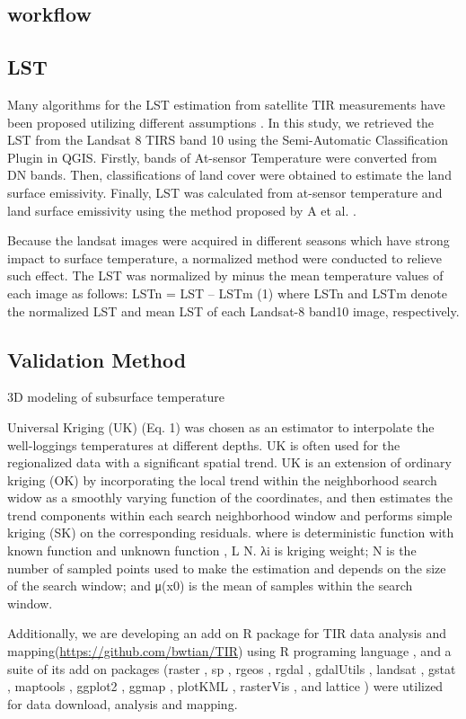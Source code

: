 \subsection{workflow}
\subsection{LST}  

Many algorithms for the LST estimation from satellite TIR measurements have been proposed utilizing different assumptions \cite{Li2013a, Li2012}. In this study, we retrieved the LST from the Landsat 8 TIRS band 10 using the Semi-Automatic Classification Plugin in QGIS. Firstly, bands of At-sensor Temperature were converted from DN bands. Then, classifications of land cover were obtained to estimate the land surface emissivity. Finally, LST was calculated from at-sensor temperature and land surface emissivity using the method proposed by A et al. \cite{Artis1982}.

Because the landsat images were acquired in different seasons which have strong impact to surface temperature, a normalized method were conducted to relieve such effect. The LST was normalized by minus the mean temperature values of each image as follows: 
LSTn = LST – LSTm                             (1)
where LSTn and LSTm denote the normalized LST and mean LST of each Landsat-8 band10 image, respectively.  

\subsection{Validation Method}
3D modeling of subsurface temperature

Universal Kriging (UK) (Eq. 1) was chosen as an estimator to interpolate the well-loggings temperatures at different depths. UK is often used for the regionalized data with a significant spatial trend. UK is an extension of ordinary kriging (OK) by incorporating the local trend within the neighborhood search widow as a smoothly varying function of the coordinates, and then estimates the trend components within each search neighborhood window and performs simple kriging (SK) on the corresponding residuals.
where  is deterministic function with known function  and unknown function , L  N. λi is kriging weight; N is the number of sampled points used to make the estimation and depends on the size of the search window; and μ(x0) is the mean of samples within the search window.

Additionally, we are developing an add on R package for TIR data analysis and mapping(\url{https://github.com/bwtian/TIR}) \cite{R-TIR} using R programing language \cite{R}, and a suite of its add on packages (raster \cite{R-raster}, sp \cite{R-sp}, rgeos \cite{R-rgeos}, rgdal \cite{R-rgdal}, gdalUtils \cite{R-gdalUtils}, landsat \cite{R-landsat}, gstat \cite{R-gstat}, maptools \cite{R-maptools}, ggplot2 \cite{R-ggplot2}, ggmap \cite{R-ggmap}, plotKML \cite{R-plotKML}, rasterVis \cite{R-rasterVis}, and lattice \cite{R-lattice}) were utilized for data download, analysis and mapping.